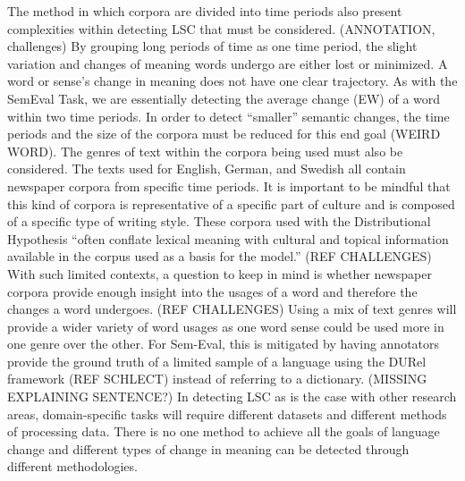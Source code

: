 The method in which corpora are divided into time periods also present complexities within detecting LSC that must be considered. \citep{hengchen2021challenges} (ANNOTATION, challenges) By grouping long periods of time as one time period, the slight variation and changes of meaning words undergo are either lost or minimized. A word or sense’s change in meaning does not have one clear trajectory. As with the SemEval Task, we are essentially detecting the average change (EW) of a word within two time periods. In order to detect “smaller” semantic changes, the time periods and the size of the corpora must be reduced for this end goal (WEIRD WORD). The genres of text within the corpora being used must also be considered. The texts used for English, German, and Swedish all contain newspaper corpora from specific time periods. It is important to be mindful that this kind of corpora is representative of a specific part of culture and is composed of a specific type of writing style. These corpora used with the Distributional Hypothesis “often conflate lexical meaning with cultural and topical information available in the corpus used as a basis for the model.” (REF CHALLENGES) With such limited contexts, a question to keep in mind is whether newspaper corpora provide enough insight into the usages of a word and therefore the changes a word undergoes. \citep{hengchen2021challenges} (REF CHALLENGES) Using a mix of text genres will provide a wider variety of word usages as one word sense could be used more in one genre over the other. For Sem-Eval, this is mitigated by having annotators provide the ground truth of a limited sample of a language using the DURel framework \citep{DURel2018}(REF SCHLECT) instead of referring to a dictionary. (MISSING EXPLAINING SENTENCE?) In detecting LSC as is the case with other research areas, domain-specific tasks will require different datasets and different methods of processing data. There is no one method to achieve all the goals of language change and different types of change in meaning can be detected through different methodologies. 
